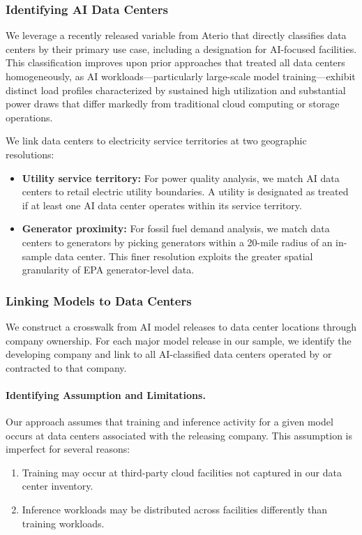 \documentclass[sigconf]{acmart}
\begin{document}
\subsubsection{Identifying AI Data Centers}

We leverage a recently released variable from Aterio that directly classifies data centers by their primary use case, including a designation for AI-focused facilities. This classification improves upon prior approaches that treated all data centers homogeneously, as AI workloads---particularly large-scale model training---exhibit distinct load profiles characterized by sustained high utilization and substantial power draws that differ markedly from traditional cloud computing or storage operations.

We link data centers to electricity service territories at two geographic resolutions:
\begin{itemize}
    \item \textbf{Utility service territory:} For power quality analysis, we match AI data centers to retail electric utility boundaries. A utility is designated as treated if at least one AI data center operates within its service territory.
    \item \textbf{Generator proximity:} For fossil fuel demand analysis, we match data centers to generators by picking generators within a 20-mile radius of an in-sample data center. This finer resolution exploits the greater spatial granularity of EPA generator-level data.
\end{itemize}

\subsubsection{Linking Models to Data Centers}

We construct a crosswalk from AI model releases to data center locations through company ownership. For each major model release in our sample, we identify the developing company and link to all AI-classified data centers operated by or contracted to that company. 

\paragraph{Identifying Assumption and Limitations.} Our approach assumes that training and inference activity for a given model occurs at data centers associated with the releasing company. This assumption is imperfect for several reasons:
\begin{enumerate}
    \item Training may occur at third-party cloud facilities not captured in our data center inventory.
    \item Inference workloads may be distributed across facilities differently than training workloads.
\end{enumerate}
\end{document}
